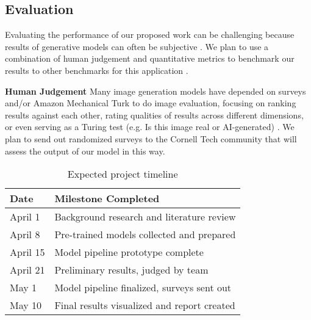 \documentclass{article}
\begin{document}
\subsection{Evaluation}
Evaluating the performance of our proposed work can be challenging because results of generative models can often be subjective \cite{borji2018eval}. We plan to use a combination of human judgement and quantitative metrics to benchmark our results to other benchmarks for this application \cite{todo}.

\textbf{Human Judgement} Many image generation models have depended on surveys and/or Amazon Mechanical Turk \cite{zhou2019hype} to do image evaluation, focusing on ranking results against each other, rating qualities of results across different dimensions, or even serving as a Turing test (e.g. Is this image real or AI-generated) \cite{salimans2016eval}. We plan to send out randomized surveys to the Cornell Tech community that will assess the output of our model in this way.


\begin{table}[h]
\centering
\begin{tabular}{|l|l|}
\hline
\textbf{Date} & \textbf{Milestone Completed}                \\ \hline
April 1       & Background research and literature review     \\ \hline
April 8       & Pre-trained models collected and prepared \\ \hline
April 15      & Model pipeline prototype complete
\\ \hline
April 21      & Preliminary results, judged by team         \\ \hline
May 1         & Model pipeline finalized, surveys sent out  \\ \hline
May 10        & Final results visualized and report created \\ \hline
\end{tabular}
\caption{Expected project timeline}
\end{table}






\newpage





\end{document}
